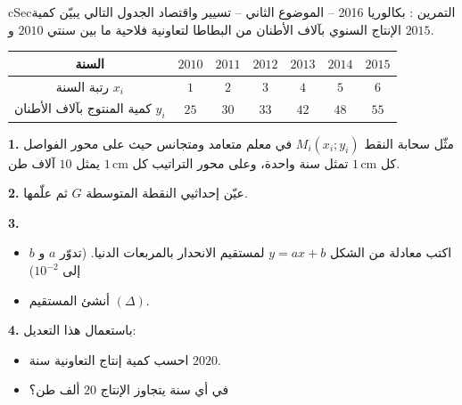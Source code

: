 \documentclass[12pt,a4paper]{article}
\newenvironment{BOX}[2]{\begin{otherlanguage}{english}\begin{arbox}{#1}{#2}}{\end{arbox}\end{otherlanguage}}
\newcounter{exo}
\newenvironment{tamrin}[1]{\stepcounter{exo}\begin{BOX}{cSec}{التمرين \theexo: #1}}{\end{BOX}}
\newenvironment{sq}{\begin{itemize}[leftmargin=2.4em,itemsep=3pt]}{\end{itemize}}
\newcommand{\qa}{\item[(أ)]}\newcommand{\qb}{\item[(ب)]}\newcommand{\qc}{\item[(جـ)]}\newcommand{\qd}{\item[(د)]}\newcommand{\qe}{\item[(هـ)]}
\newcommand{\QQ}[1]{\par\smallskip\textbf{#1.} }
\begin{document}
\begin{tamrin}{بكالوريا 2016 -- الموضوع الثاني -- تسيير واقتصاد}
الجدول التالي يبيّن كمية الإنتاج السنوي بآلاف الأطنان من البطاطا لتعاونية فلاحية ما بين سنتي $2010$ و $2015$.
\begin{center}
\begin{tabular}{|C|c|c|c|c|c|c|}\hline
{} السنة & $2010$ & $2011$ & $2012$ & $2013$ & $2014$ & $2015$\\\hline
رتبة السنة $x_i$ & $1$ & $2$ & $3$ & $4$ & $5$ & $6$\\\hline
كمية المنتوج بآلاف الأطنان $y_i$ & $25$ & $30$ & $33$ & $42$ & $48$ & $55$\\\hline
\end{tabular}
\end{center}

\QQ{1} مثّل سحابة النقط $M_i(x_i;y_i)$ في معلم متعامد ومتجانس حيث على محور الفواصل كل $1\,\text{cm}$ تمثل سنة واحدة، وعلى محور التراتيب كل $1\,\text{cm}$ يمثل $10$ آلاف طن.
\QQ{2} عيّن إحداثيي النقطة المتوسطة $G$ ثم علّمها.
\QQ{3}
\begin{sq}
\qa اكتب معادلة من الشكل $y=ax+b$ لمستقيم الانحدار بالمربعات الدنيا. (تدوّر $a$ و $b$ إلى $10^{-2}$)
\qb أنشئ المستقيم $(\Delta)$.
\end{sq}
\QQ{4} باستعمال هذا التعديل:
\begin{itemize}
\item احسب كمية إنتاج التعاونية سنة $2020$.
\item في أي سنة يتجاوز الإنتاج $20$ ألف طن؟
\end{itemize}
\end{tamrin}

\Needspace{13cm}
\end{document}
